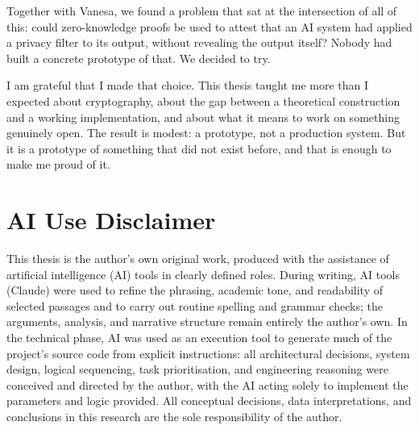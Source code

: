 \documentclass[11pt, a4paper, twoside, openany]{tfg_dtic_upf}
\let\cleardoublepage\clearpage
\theoremstyle{definition}
\theoremstyle{plain}
\numberwithin{equation}{section}
\begin{document}
\medskip

Together with Vanesa, we found a problem that sat at the intersection of all of this: could zero-knowledge proofs be used to attest that an AI system had applied a privacy filter to its output, without revealing the output itself? Nobody had built a concrete prototype of that. We decided to try.

\medskip

I am grateful that I made that choice. This thesis taught me more than I expected about cryptography, about the gap between a theoretical construction and a working implementation, and about what it means to work on something genuinely open. The result is modest: a prototype, not a production system. But it is a prototype of something that did not exist before, and that is enough to make me proud of it.


\cleardoublepage

\tableofcontents

\cleardoublepage
\section*{\Large \sffamily AI Use Disclaimer}
This thesis is the author's own original work, produced with the assistance of artificial intelligence (AI) tools in clearly defined roles. During writing, AI tools (Claude) were used to refine the phrasing, academic tone, and readability of selected passages and to carry out routine spelling and grammar checks; the arguments, analysis, and narrative structure remain entirely the author's own. In the technical phase, AI was used as an execution tool to generate much of the project's source code from explicit instructions: all architectural decisions, system design, logical sequencing, task prioritisation, and engineering reasoning were conceived and directed by the author, with the AI acting solely to implement the parameters and logic provided. All conceptual decisions, data interpretations, and conclusions in this research are the sole responsibility of the author.

\listoffigures
{}

\listoftables
{}

\mainmatter








\end{document}
